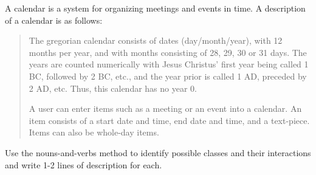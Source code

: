 A calendar is a system for organizing meetings and events in time. A description of a calendar is as follows:
\begin{quote}
  The gregorian calendar consists of dates (day/month/year), with 12 months per year, and with months consisting of 28, 29, 30 or 31 days. The years are counted numerically with Jesus Christus' first year being called 1 BC, followed by 2 BC, etc., and the year prior is called 1 AD, preceded by 2 AD, etc. Thus, this calendar has no year 0.

  A user can enter items such as a meeting or an event into a calendar. An item consists of a start date and time, end date and time, and a text-piece. Items can also be whole-day items.
\end{quote}
Use the nouns-and-verbs method to identify possible classes and their interactions and write 1-2 lines of description for each.
